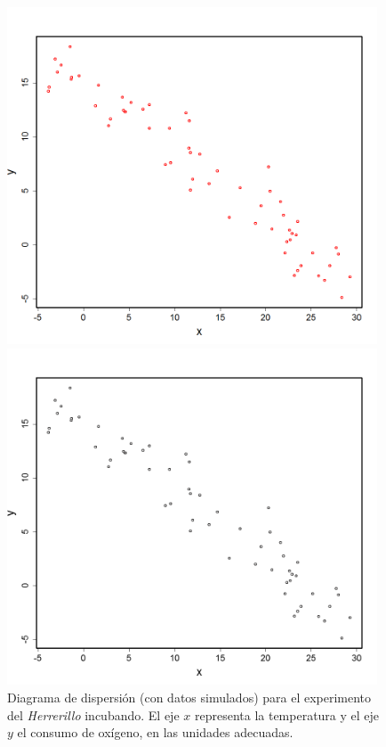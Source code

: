 \begin{figure}[t]
\begin{center}
\begin{enColor}
\includegraphics[width=11cm]{../fig/Cap10-GraficoDispersionHerrerilloSimulado.png}
\end{enColor}
\begin{bn}
\includegraphics[width=11cm]{../fig/Cap10-GraficoDispersionHerrerilloSimulado-bn.png}
\end{bn}
\caption{Diagrama de dispersión (con datos simulados) para el experimento del {\em Herrerillo} incubando. El eje $x$ representa la temperatura y el eje $y$ el consumo de oxígeno, en las unidades adecuadas.}
\label{cap10:fig:Herrerillo01}
\end{center}
\end{figure}


